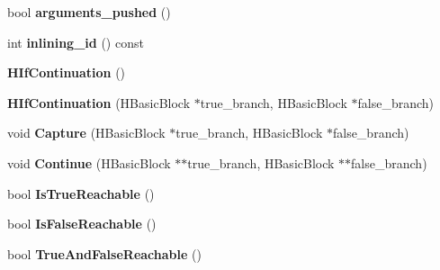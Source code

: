 \begin{DoxyCompactItemize}
\item 
\hypertarget{classv8_1_1internal_1_1_v8___f_i_n_a_l_a8d1dde39403117c7c90750926ef1351f}{}bool {\bfseries arguments\+\_\+pushed} ()\label{classv8_1_1internal_1_1_v8___f_i_n_a_l_a8d1dde39403117c7c90750926ef1351f}

\item 
\hypertarget{classv8_1_1internal_1_1_v8___f_i_n_a_l_a9991340f296dce8de432aff734ecb172}{}int {\bfseries inlining\+\_\+id} () const \label{classv8_1_1internal_1_1_v8___f_i_n_a_l_a9991340f296dce8de432aff734ecb172}

\item 
\hypertarget{classv8_1_1internal_1_1_v8___f_i_n_a_l_aa9d3dbb38bca52dc065c334511c41ad4}{}{\bfseries H\+If\+Continuation} ()\label{classv8_1_1internal_1_1_v8___f_i_n_a_l_aa9d3dbb38bca52dc065c334511c41ad4}

\item 
\hypertarget{classv8_1_1internal_1_1_v8___f_i_n_a_l_ab5f2fca8f46eefebb55e8e7d4a4ac718}{}{\bfseries H\+If\+Continuation} (H\+Basic\+Block $\ast$true\+\_\+branch, H\+Basic\+Block $\ast$false\+\_\+branch)\label{classv8_1_1internal_1_1_v8___f_i_n_a_l_ab5f2fca8f46eefebb55e8e7d4a4ac718}

\item 
\hypertarget{classv8_1_1internal_1_1_v8___f_i_n_a_l_a38fa0399ed1b270192b48ee172f0fb2f}{}void {\bfseries Capture} (H\+Basic\+Block $\ast$true\+\_\+branch, H\+Basic\+Block $\ast$false\+\_\+branch)\label{classv8_1_1internal_1_1_v8___f_i_n_a_l_a38fa0399ed1b270192b48ee172f0fb2f}

\item 
\hypertarget{classv8_1_1internal_1_1_v8___f_i_n_a_l_af3c3931beb7b5f889b0ba5de09a38f30}{}void {\bfseries Continue} (H\+Basic\+Block $\ast$$\ast$true\+\_\+branch, H\+Basic\+Block $\ast$$\ast$false\+\_\+branch)\label{classv8_1_1internal_1_1_v8___f_i_n_a_l_af3c3931beb7b5f889b0ba5de09a38f30}

\item 
\hypertarget{classv8_1_1internal_1_1_v8___f_i_n_a_l_a592b6e146781c40ef5aa02c79c334b42}{}bool {\bfseries Is\+True\+Reachable} ()\label{classv8_1_1internal_1_1_v8___f_i_n_a_l_a592b6e146781c40ef5aa02c79c334b42}

\item 
\hypertarget{classv8_1_1internal_1_1_v8___f_i_n_a_l_ab30be1cd47853359de6e5b0870e78df0}{}bool {\bfseries Is\+False\+Reachable} ()\label{classv8_1_1internal_1_1_v8___f_i_n_a_l_ab30be1cd47853359de6e5b0870e78df0}

\item 
\hypertarget{classv8_1_1internal_1_1_v8___f_i_n_a_l_a9b67867935fb9994b492bba6950bdb14}{}bool {\bfseries True\+And\+False\+Reachable} ()\label{classv8_1_1internal_1_1_v8___f_i_n_a_l_a9b67867935fb9994b492bba6950bdb14}


\end{DoxyCompactItemize}
